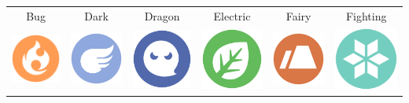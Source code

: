 \begin{table}
\begin{tabular}{c c c c c c}
  Bug & Dark & Dragon & Electric & Fairy & Fighting \\
  \includegraphics[scale=.25]{images/fire.png} &
    \includegraphics[scale=.25]{images/flying.png} &
    \includegraphics[scale=.25]{images/ghost.png} &
    \includegraphics[scale=.25]{images/grass.png} &
    \includegraphics[scale=.25]{images/ground.png} &
    \includegraphics[scale=.25]{images/ice.png} \\

\end{tabular}
\end{table}
